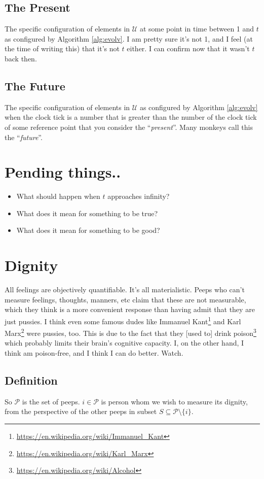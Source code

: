 \documentclass{report}
\begin{document}
\section{The Present}
The specific configuration of elements in $\mathcal{U}$ at some point in time between 1
and $t$ as configured by Algorithm \ref{alg:evolv}. I am pretty sure it's not 1,
and I feel (at the time of writing this) that it's not $t$ either. I can
confirm now that it wasn't $t$ back then.

\section{The Future}
The specific configuration of elements in $\mathcal{U}$ as configured by Algorithm
\ref{alg:evolv} when the clock tick is a number that is greater than the number
of the clock tick of some reference point that you consider the
``\emph{present}''. Many monkeys call this the ``\emph{future}''.

\chapter{Pending things..}
\begin{itemize}
    \item What should happen when $t$ approaches infinity?
    \item What does it mean for something to be true?
    \item What does it mean for something to be good?
\end{itemize}

\chapter{Dignity}
All feelings are objectively quantifiable. It's all materialistic.
Peeps who can't measure feelings, thoughts, manners, etc claim that these are
not measurable, which they think is a more convenient response than having
admit that they are just pussies. I think even some famous dudes like Immanuel
Kant\footnote{\url{https://en.wikipedia.org/wiki/Immanuel_Kant}} and Karl
Marx\footnote{\url{https://en.wikipedia.org/wiki/Karl_Marx}} were pussies, too.
This is due to the fact that they [used to] drink
poison\footnote{\url{https://en.wikipedia.org/wiki/Alcohol}} which probably
limits their brain's cognitive capacity. I, on the other hand, I think am
poison-free, and I think I can do better.  Watch.

\section{Definition}
So $\mathcal{P}$ is the set of peeps. $i \in \mathcal{P}$ is person whom we
wish to measure its dignity, from the perspective of the other peeps in subset
$S \subseteq \mathcal{P} \setminus \{i\}$.
\end{document}
